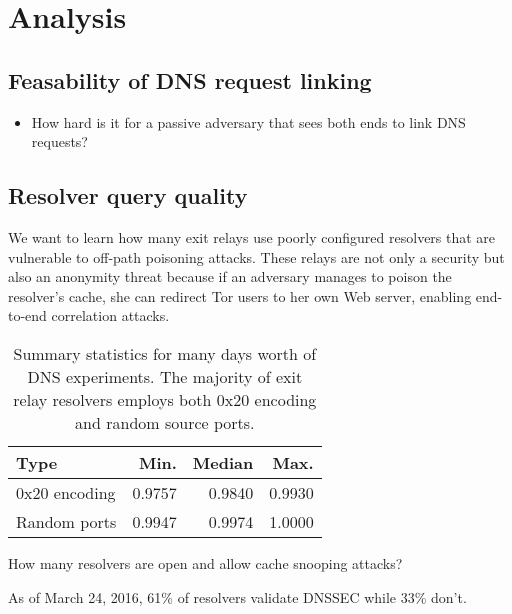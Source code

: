 \section{Analysis}
\label{sec:analysis}

\subsection{Feasability of DNS request linking}
\begin{itemize}
	\item How hard is it for a passive adversary that sees both ends to link DNS
		requests?
\end{itemize}

\subsection{Resolver query quality}
We want to learn how many exit relays use poorly configured resolvers that are
vulnerable to off-path poisoning attacks.  These relays are not only a security
but also an anonymity threat because if an adversary manages to poison the
resolver's cache, she can redirect Tor users to her own Web server, enabling
end-to-end correlation attacks.

\begin{table}[t]
	\centering
	\begin{tabular}{l r r r}
	\toprule
	\textbf{Type} & \textbf{Min.} & \textbf{Median} & \textbf{Max.} \\
	\midrule
	0x20 encoding & 0.9757 & 0.9840 & 0.9930 \\
	Random ports & 0.9947 & 0.9974 & 1.0000 \\
	\bottomrule
	\end{tabular}
	\caption{Summary statistics for many days worth of DNS experiments.  The
	majority of exit relay resolvers employs both 0x20 encoding and random
	source ports.}
	\label{tab:query-quality}
\end{table}

How many resolvers are open and allow cache snooping attacks?

As of March 24, 2016, 61\% of resolvers validate DNSSEC while 33\% don't.
